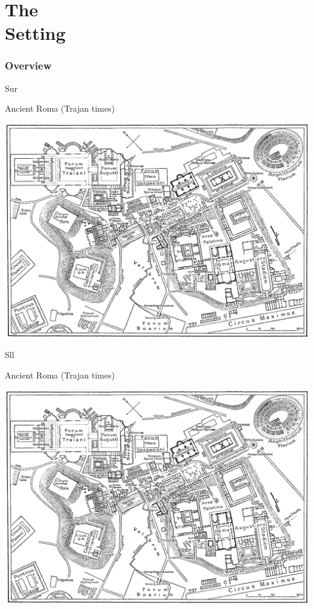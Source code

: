 \documentclass[print,Draft]{faosyb}
\begin{document}
\addtocounter{page}{1}  %

\frontmatter

\mainmatter
{}
\part[The Setting]{The\\ Setting}
\lipsum
\EndPartIntro

\section{Overview}
\label{sec:first}

\begin{map}{S}{ur}
\caption{Ancient Roma \newline (Trajan times)}
\label{map:roma}
\includegraphics[width=\chartwidth,height=\chartheight]{Rome}
\end{map}

\begin{map}{S}{ll}
\caption{Ancient Roma \newline (Trajan times)}
\label{map:roma}
\includegraphics[width=\chartwidth,height=\chartheight]{Rome}
\end{map}
\end{document}
